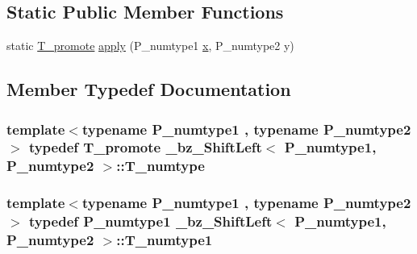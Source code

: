 \subsection*{Static Public Member Functions}
\begin{DoxyCompactItemize}
\item 
static \hyperlink{minmax_8h_aaa88a440c2f0d00798d5b1d42c79308d}{T\+\_\+promote} \hyperlink{class__bz__ShiftLeft_aee85b907c65cbfe2e61d979bcb5815f0}{apply} (P\+\_\+numtype1 \hyperlink{vecnorm1_8cc_ac73eed9e41ec09d58f112f06c2d6cb63}{x}, P\+\_\+numtype2 y)
\end{DoxyCompactItemize}


\subsection{Member Typedef Documentation}
\hypertarget{class__bz__ShiftLeft_aa5c1d4f725128c97a4fbc3f8186581c3}{}
\subsubsection[{T\+\_\+numtype}]{\setlength{\rightskip}{0pt plus 5cm}template$<$typename P\+\_\+numtype1 , typename P\+\_\+numtype2 $>$ typedef {\bf T\+\_\+promote} {\bf \+\_\+bz\+\_\+\+Shift\+Left}$<$ P\+\_\+numtype1, P\+\_\+numtype2 $>$\+::{\bf T\+\_\+numtype}}\label{class__bz__ShiftLeft_aa5c1d4f725128c97a4fbc3f8186581c3}
\hypertarget{class__bz__ShiftLeft_a80f900fe7ba18cce4a1b9c31fcf811a5}{}
\subsubsection[{T\+\_\+numtype1}]{\setlength{\rightskip}{0pt plus 5cm}template$<$typename P\+\_\+numtype1 , typename P\+\_\+numtype2 $>$ typedef P\+\_\+numtype1 {\bf \+\_\+bz\+\_\+\+Shift\+Left}$<$ P\+\_\+numtype1, P\+\_\+numtype2 $>$\+::{\bf T\+\_\+numtype1}}\label{class__bz__ShiftLeft_a80f900fe7ba18cce4a1b9c31fcf811a5}
\hypertarget{class__bz__ShiftLeft_a1bd6fec9610d921416764618bf2333b0}{}
